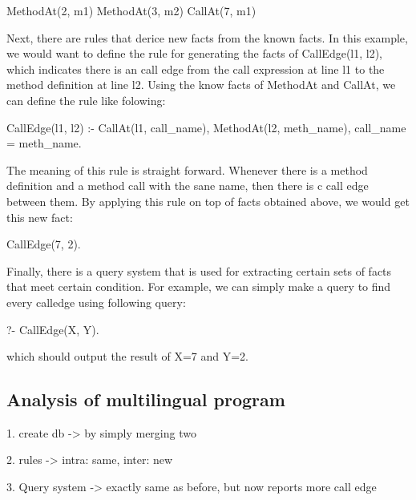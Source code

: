 MethodAt(2, m1)
MethodAt(3, m2)
CallAt(7, m1)

Next, there are rules that derice new facts from the known facts.
In this example, we would want to define the rule for generating the facts of
CallEdge(l1, l2), which indicates there is an call edge from the call expression at line l1
to the method definition at line l2. Using the know facts of MethodAt and CallAt,
we can define the rule like folowing:

CallEdge(l1, l2) :-
    CallAt(l1, call\_name),
    MethodAt(l2, meth\_name),
    call\_name = meth\_name.

The meaning of this rule is straight forward. Whenever there is a method definition
and a method call with the sane name, then there is c call edge between them.
By applying this rule on top of facts obtained above, we would
get this new fact:

CallEdge(7, 2).

Finally, there is a query system that is used for extracting certain sets of facts
that meet certain condition. For example, we can simply make a query to find every calledge
using following query:

?- CallEdge(X, Y).

which should output the result of X=7 and Y=2.



\subsection{Analysis of multilingual program}
1. create db -> by simply merging two

2. rules -> intra: same, inter: new

3. Query system -> exactly same as before, but now reports more call edge
